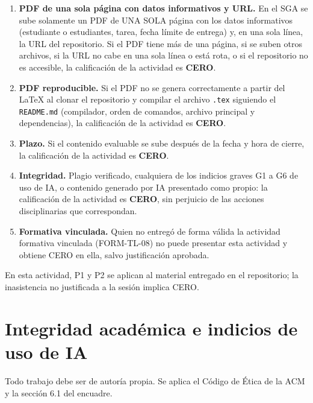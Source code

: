 \documentclass[11pt]{article}
\newcommand{\seccion}[1]{\section{\textcolor{utegreendk}{#1}}}
\begin{document}
\begin{cajapiso}[title={Criterios de piso: su incumplimiento implica calificación CERO en la actividad}]
	\begin{enumerate}[label=\textbf{P\arabic*.},leftmargin=24pt,itemsep=3pt]
		\item \textbf{PDF de una sola página con datos informativos y URL.} En el SGA se sube solamente un PDF de UNA SOLA página con los datos informativos (estudiante o estudiantes, tarea, fecha límite de entrega) y, en una sola línea, la URL del repositorio. Si el PDF tiene más de una página, si se suben otros archivos, si la URL no cabe en una sola línea o está rota, o si el repositorio no es accesible, la calificación de la actividad es \textbf{CERO}.
		\item \textbf{PDF reproducible.} Si el PDF no se genera correctamente a partir del \LaTeX{} al clonar el repositorio y compilar el archivo \texttt{.tex} siguiendo el \texttt{README.md} (compilador, orden de comandos, archivo principal y dependencias), la calificación de la actividad es \textbf{CERO}.
		\item \textbf{Plazo.} Si el contenido evaluable se sube después de la fecha y hora de cierre, la calificación de la actividad es \textbf{CERO}.
		\item \textbf{Integridad.} Plagio verificado, cualquiera de los indicios graves G1 a G6 de uso de IA, o contenido generado por IA presentado como propio: la calificación de la actividad es \textbf{CERO}, sin perjuicio de las acciones disciplinarias que correspondan.
		\item \textbf{Formativa vinculada.} Quien no entregó de forma válida la actividad formativa vinculada (FORM-TL-08) no puede presentar esta actividad y obtiene CERO en ella, salvo justificación aprobada.
	\end{enumerate}
	En esta actividad, P1 y P2 se aplican al material entregado en el repositorio; la inasistencia no justificada a la sesión implica CERO.
\end{cajapiso}

\seccion{Integridad académica e indicios de uso de IA}

Todo trabajo debe ser de autoría propia. Se aplica el Código de Ética de la ACM \citep{acm_code_2018} y la sección 6.1 del encuadre.
\end{document}
